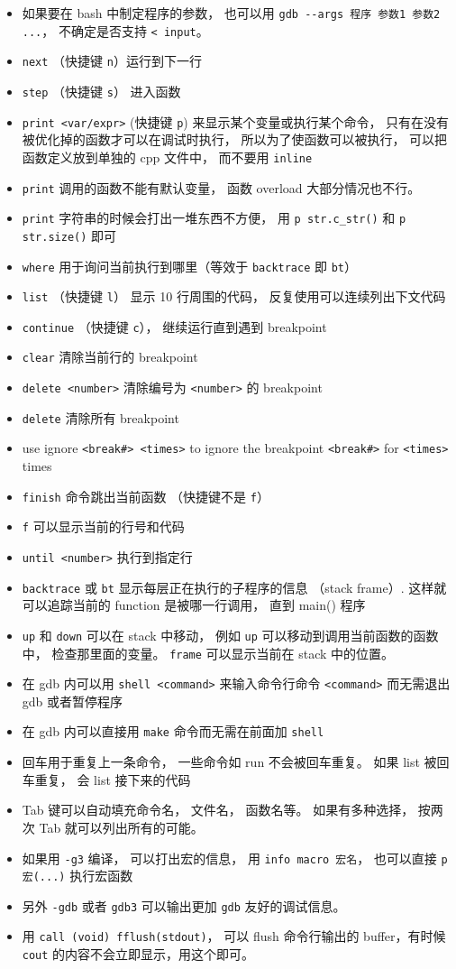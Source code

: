 \begin{itemize}
\item 如果要在 bash 中制定程序的参数， 也可以用 \verb|gdb --args 程序 参数1 参数2 ...|， 不确定是否支持 \verb|< input|。
\item \verb`next` （快捷键 \verb`n`）运行到下一行 
\item \verb`step` （快捷键 \verb`s`） 进入函数
\item \verb`print <var/expr>` (快捷键 \verb`p`) 来显示某个变量或执行某个命令， 只有在没有被优化掉的函数才可以在调试时执行， 所以为了使函数可以被执行， 可以把函数定义放到单独的 cpp 文件中， 而不要用 \verb`inline`
\item \verb`print` 调用的函数不能有默认变量， 函数 overload 大部分情况也不行。
\item \verb`print` 字符串的时候会打出一堆东西不方便， 用 \verb`p str.c_str()` 和 \verb`p str.size()` 即可
\item \verb`where` 用于询问当前执行到哪里（等效于 \verb`backtrace` 即 \verb`bt`）
\item \verb`list` （快捷键 \verb`l`） 显示 10 行周围的代码， 反复使用可以连续列出下文代码
\item \verb`continue` （快捷键 \verb`c`）， 继续运行直到遇到 breakpoint
\item \verb`clear` 清除当前行的 breakpoint
\item \verb`delete <number>` 清除编号为 \verb`<number>` 的 breakpoint
\item \verb`delete` 清除所有 breakpoint
\item use ignore \verb`<break#> <times>` to ignore the breakpoint \verb`<break#>` for \verb`<times>` times
\item \verb`finish` 命令跳出当前函数 （快捷键不是 \verb`f`）
\item \verb`f` 可以显示当前的行号和代码
\item \verb`until <number>` 执行到指定行
\item \verb`backtrace` 或 \verb`bt` 显示每层正在执行的子程序的信息 （stack frame）. 这样就可以追踪当前的 function 是被哪一行调用， 直到 main() 程序
\item \verb|up| 和 \verb|down| 可以在 stack 中移动， 例如 \verb|up| 可以移动到调用当前函数的函数中， 检查那里面的变量。 \verb`frame` 可以显示当前在 stack 中的位置。
\item 在 gdb 内可以用 \verb`shell <command>` 来输入命令行命令 \verb`<command>` 而无需退出 gdb 或者暂停程序
\item 在 gdb 内可以直接用 \verb`make` 命令而无需在前面加 \verb`shell`
\item 回车用于重复上一条命令， 一些命令如 run 不会被回车重复。 如果 list 被回车重复， 会 list 接下来的代码
\item Tab 键可以自动填充命令名， 文件名， 函数名等。 如果有多种选择， 按两次 Tab 就可以列出所有的可能。
\item 如果用 \verb|-g3| 编译， 可以打出宏的信息， 用 \verb|info macro 宏名|， 也可以直接 \verb|p 宏(...)| 执行宏函数
\item 另外 \verb|-gdb| 或者 \verb|gdb3| 可以输出更加 \verb|gdb| 友好的调试信息。
\item 用 \verb|call (void) fflush(stdout)|， 可以 flush 命令行输出的 buffer，有时候 \verb|cout| 的内容不会立即显示，用这个即可。
\end{itemize}
